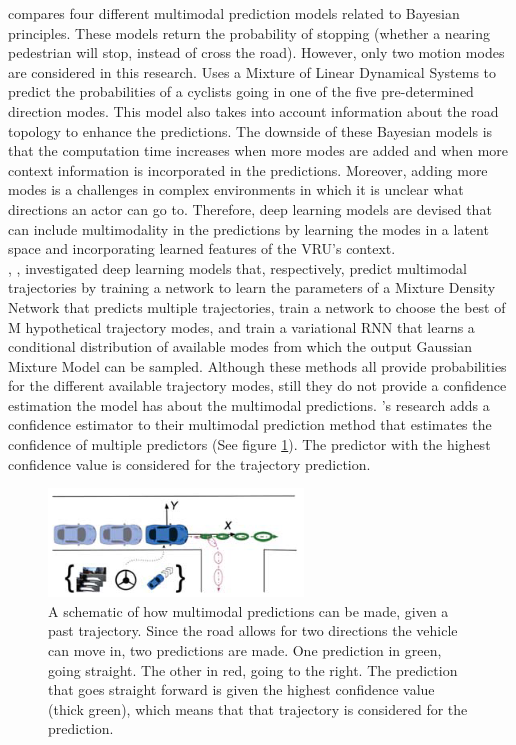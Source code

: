 \cite{keller2013will} compares four different multimodal prediction models related to Bayesian principles. These models return the probability of stopping (whether a nearing pedestrian will stop, instead of cross the road). However, only two motion modes are considered in this research. \cite{pool2017using} Uses a Mixture of Linear Dynamical Systems to predict the probabilities of a cyclists going in one of the five pre-determined direction modes. This model also takes into account information about the road topology to enhance the predictions. The downside of these Bayesian models is that the computation time increases when more modes are added and when more context information is incorporated in the predictions. Moreover, adding more modes is a challenges in complex environments in which it is unclear what directions an actor can go to. Therefore, deep learning models are devised that can include multimodality in the predictions by learning the modes in a latent space and incorporating learned features of the VRU's context. \\
\cite{rehder2018pedestrian}, \cite{cui2019multimodal}, \cite{brito2020social} investigated deep learning models that, respectively, predict multimodal trajectories by training a network to learn the parameters of a Mixture Density Network that predicts multiple trajectories, train a network to choose the best of M hypothetical trajectory modes, and train a variational RNN that learns a conditional distribution of available modes from which the output Gaussian Mixture Model can be sampled. Although these methods all provide probabilities for the different available trajectory modes, still they do not provide a confidence estimation the model has about the multimodal predictions. \cite{huang2019uncertainty}'s research adds a confidence estimator to their multimodal prediction method that estimates the confidence of multiple predictors (See figure \ref{fig:multimod}). The predictor with the highest confidence value is considered for the trajectory prediction. 

\begin{figure}[h!]
	\centering
	\includegraphics[width=0.4\linewidth]{Figures/Introduction/Multimodality_Huang}
	\caption{A schematic of how multimodal predictions can be made, given a past trajectory. Since the road allows for two directions the vehicle can move in, two predictions are made. One prediction in green, going straight. The other in red, going to the right. The prediction that goes straight forward is given the highest confidence value (thick green), which means that that trajectory is considered for the prediction.  \cite{huang2019uncertainty}}  
	\label{fig:multimod}
\end{figure}

